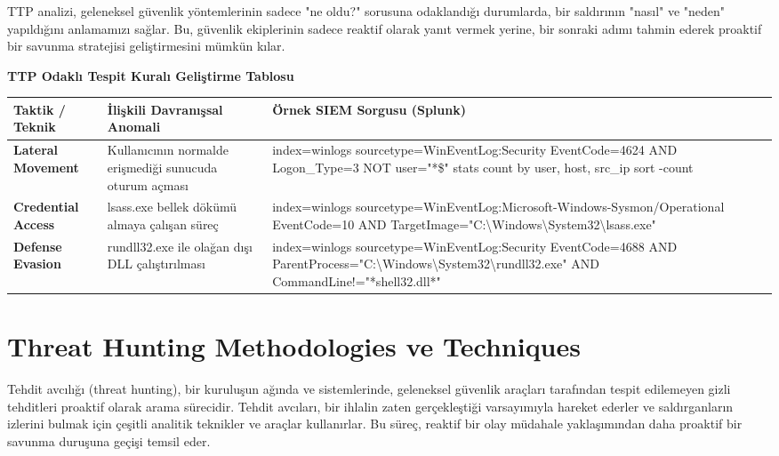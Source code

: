 TTP analizi, geleneksel güvenlik yöntemlerinin sadece "ne oldu?" sorusuna odaklandığı durumlarda, bir saldırının "nasıl" ve "neden" yapıldığını anlamamızı sağlar. Bu, güvenlik ekiplerinin sadece reaktif olarak yanıt vermek yerine, bir sonraki adımı tahmin ederek proaktif bir savunma stratejisi geliştirmesini mümkün kılar.

\textbf{TTP Odaklı Tespit Kuralı Geliştirme Tablosu}

\begin{tabular}{|p{3cm}|p{5cm}|p{7cm}|}
\hline
\textbf{Taktik / Teknik} & \textbf{İlişkili Davranışsal Anomali} & \textbf{Örnek SIEM Sorgusu (Splunk)} \\
\hline
\textbf{Lateral Movement} & Kullanıcının normalde erişmediği sunucuda oturum açması & index=winlogs sourcetype=WinEventLog:Security EventCode=4624 AND Logon\_Type=3 NOT user="*\$" stats count by user, host, src\_ip sort -count \\
\hline
\textbf{Credential Access} & lsass.exe bellek dökümü almaya çalışan süreç & index=winlogs sourcetype=WinEventLog:Microsoft-Windows-Sysmon/Operational EventCode=10 AND TargetImage="C:\textbackslash Windows\textbackslash System32\textbackslash lsass.exe" \\
\hline
\textbf{Defense Evasion} & rundll32.exe ile olağan dışı DLL çalıştırılması & index=winlogs sourcetype=WinEventLog:Security EventCode=4688 AND ParentProcess="C:\textbackslash Windows\textbackslash System32\textbackslash rundll32.exe" AND CommandLine!="*shell32.dll*" \\
\hline
\end{tabular}

\section{Threat Hunting Methodologies ve Techniques}

Tehdit avcılığı (threat hunting), bir kuruluşun ağında ve sistemlerinde, geleneksel güvenlik araçları tarafından tespit edilemeyen gizli tehditleri proaktif olarak arama sürecidir. Tehdit avcıları, bir ihlalin zaten gerçekleştiği varsayımıyla hareket ederler ve saldırganların izlerini bulmak için çeşitli analitik teknikler ve araçlar kullanırlar. Bu süreç, reaktif bir olay müdahale yaklaşımından daha proaktif bir savunma duruşuna geçişi temsil eder.


